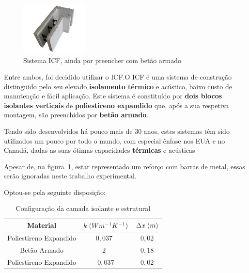 \documentclass[12pt, a4paper]{article}
\begin{document}
\begin{figure}[htpb]
	\centering
	\includegraphics[width=0.3\textwidth]{icf-exemplo.png}

	\caption{Sistema ICF, ainda por preencher com betão armado}\label{fig:icf1}
\end{figure}

Entre ambos, foi decidido utilizar o ICF.\@ O ICF é uma sistema de construção distinguido pelo seu elevado
\textbf{isolamento térmico} e acústico, baixo custo de manutenção e fácil aplicação. Este sistema é constituído por
\textbf{dois blocos isolantes verticais} de \textbf{poliestireno expandido} que, após a sua respetiva montagem,
são preenchidos por \textbf{betão armado}.


Tendo sido desenvolvidos há pouco mais de 30 anos, estes sistemas têm sido utilizados um pouco por todo o mundo,
com especial ênfase nos EUA e no Canadá, dadas as suas ótimas capacidades \textbf{térmicas} e acústicas

Apesar de, na figura~\ref{fig:icf1}, estar representado um reforço com barras de metal, essas serão
ignoradas neste trabalho experimental.

Optou-se pela seguinte disposição:

\begin{table}[htpb]
    \begin{center}
        \begin{tabular}{||c c c||}
            \hline
            Material               & $k \hspace{1mm} (Wm^{-1}K^{-1})$ & $\Delta x \hspace{1mm} (m)$ \\ [0.5ex]
            \hline\hline
            Poliestireno Expandido & $0,037$~\cite{poliestireno_k}          & $0,02$                      \\
            \hline
            Betão Armado           & $2$~\cite{betao_armado}                  & $0,18$                      \\
            \hline
            Poliestireno Expandido & $0,037$                          & $0,02$                      \\
            \hline
        \end{tabular}
    \end{center}
    \caption{Configura\c{c}\~ao da camada isolante e estrutural}
\end{table}
\end{document}
